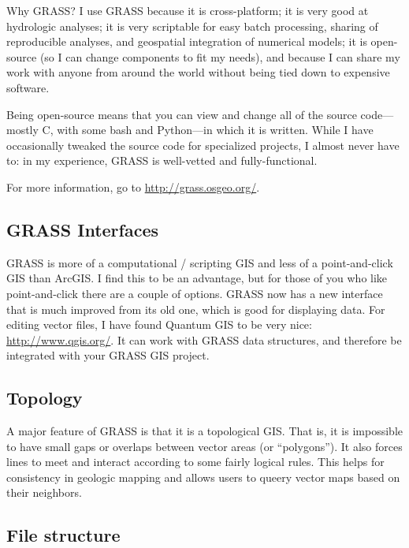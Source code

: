 \documentclass{book}
\begin{document}
\begin{boxx}[!ht]
\begin{bclogo}[arrondi = 0.1, logo = \bcrosevents]{Why GRASS?}
I use GRASS because it is cross-platform; it is very good at hydrologic analyses; it is very scriptable for easy batch processing, sharing of reproducible analyses, and geospatial integration of numerical models; it is open-source (so I can change components to fit my needs), and because I can share my work with anyone from around the world without being tied down to expensive software. \\
\end{bclogo}
\caption{Why GRASS?}
\end{boxx}

Being open-source means that you can view and change all of the source code---mostly C, with some bash and Python---in which it is written. While I have occasionally tweaked the source code for specialized projects, I almost never have to: in my experience, GRASS is well-vetted and fully-functional.

For more information, go to \url{http://grass.osgeo.org/}.

\subsection{GRASS Interfaces}

GRASS is more of a computational / scripting GIS and less of a point-and-click GIS than ArcGIS. I find this to be an advantage, but for those of you who like point-and-click there are a couple of options. GRASS now has a new interface that is much improved from its old one, which is good for displaying data. For editing vector files, I have found Quantum GIS to be very nice: \url{http://www.qgis.org/}. It can work with GRASS data structures, and therefore be integrated with your GRASS GIS project.

\subsection{Topology}

A major feature of GRASS is that it is a topological GIS. That is, it is impossible to have small gaps or overlaps between vector areas (or ``polygons''). It also forces lines to meet and interact according to some fairly logical rules. This helps for consistency in geologic mapping and allows users to queery vector maps based on their neighbors.

\subsection{File structure}
\end{document}
